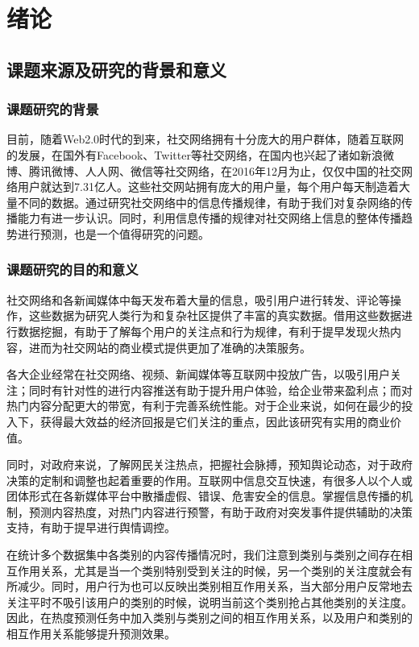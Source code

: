 
\chapter{绪论}

\section{课题来源及研究的背景和意义}
\subsection{课题研究的背景}
目前，随着Web2.0时代的到来，社交网络拥有十分庞大的用户群体，随着互联网的发展，在国外有Facebook、Twitter等社交网络，在国内也兴起了诸如新浪微博、腾讯微博、人人网、微信等社交网络，在2016年12月为止，仅仅中国的社交网络用户就达到7.31亿人。这些社交网站拥有庞大的用户量，每个用户每天制造着大量不同的数据。通过研究社交网络中的信息传播规律，有助于我们对复杂网络的传播能力有进一步认识。同时，利用信息传播的规律对社交网络上信息的整体传播趋势进行预测，也是一个值得研究的问题。
\subsection{课题研究的目的和意义}
社交网络和各新闻媒体中每天发布着大量的信息，吸引用户进行转发、评论等操作，这些数据为研究人类行为和复杂社区提供了丰富的真实数据。借用这些数据进行数据挖掘，有助于了解每个用户的关注点和行为规律，有利于提早发现火热内容，进而为社交网站的商业模式提供更加了准确的决策服务。

各大企业经常在社交网络、视频、新闻媒体等互联网中投放广告，以吸引用户关注；同时有针对性的进行内容推送有助于提升用户体验，给企业带来盈利点；而对热门内容分配更大的带宽，有利于完善系统性能。对于企业来说，如何在最少的投入下，获得最大效益的经济回报是它们关注的重点，因此该研究有实用的商业价值。

同时，对政府来说，了解网民关注热点，把握社会脉搏，预知舆论动态，对于政府决策的定制和调整也起着重要的作用。互联网中信息交互快速，有很多人以个人或团体形式在各新媒体平台中散播虚假、错误、危害安全的信息。掌握信息传播的机制，预测内容热度，对热门内容进行预警，有助于政府对突发事件提供辅助的决策支持，有助于提早进行舆情调控。

在统计多个数据集中各类别的内容传播情况时，我们注意到类别与类别之间存在相互作用关系，尤其是当一个类别特别受到关注的时候，另一个类别的关注度就会有所减少。同时，用户行为也可以反映出类别相互作用关系，当大部分用户反常地去关注平时不吸引该用户的类别的时候，说明当前这个类别抢占其他类别的关注度。因此，在热度预测任务中加入类别与类别之间的相互作用关系，以及用户和类别的相互作用关系能够提升预测效果。

